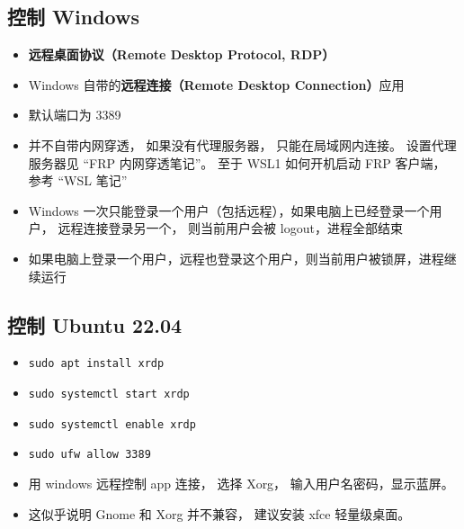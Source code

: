 
\begin{issues}
\issueDraft
\end{issues}

\subsection{控制 Windows}
\begin{itemize}
\item \textbf{远程桌面协议（Remote Desktop Protocol, RDP）}
\item Windows 自带的\textbf{远程连接（Remote Desktop Connection）}应用
\item 默认端口为 3389
\item 并不自带内网穿透， 如果没有代理服务器， 只能在局域网内连接。 设置代理服务器见 “FRP 内网穿透笔记”。 至于 WSL1 如何开机启动 FRP 客户端， 参考 “WSL 笔记”
\item Windows 一次只能登录一个用户（包括远程），如果电脑上已经登录一个用户， 远程连接登录另一个， 则当前用户会被 logout，进程全部结束
\item 如果电脑上登录一个用户，远程也登录这个用户，则当前用户被锁屏，进程继续运行
\end{itemize}

\subsection{控制 Ubuntu 22.04}
\begin{itemize}
\item \verb|sudo apt install xrdp|
\item \verb|sudo systemctl start xrdp|
\item \verb|sudo systemctl enable xrdp|
\item \verb|sudo ufw allow 3389|
\item 用 windows 远程控制 app 连接， 选择 Xorg， 输入用户名密码，显示蓝屏。
\item 这似乎说明 Gnome 和 Xorg 并不兼容， 建议安装 xfce 轻量级桌面。
\end{itemize}
